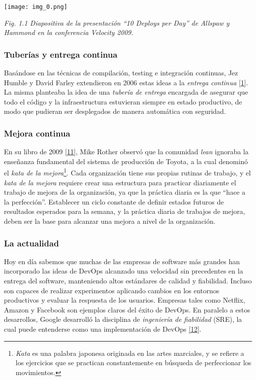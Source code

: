 \texttt{[image: img\_0.png]}


\textit{Fig. 1.1 Diapositiva de la presentación “10 Deploys per Day” de Allspaw y Hammond en la conferencia Velocity 2009.}

\subsubsection{Tuberías y entrega continua}

Basándose en las técnicas de compilación, testing e integración continuas, Jez Humble y David Farley extendieron en 2006 estas ideas a la \textit{entrega continua} \href{https://www.zotero.org/google-docs/?dRCWEw}{[1]}. La misma planteaba la idea de una \textit{tubería de entrega} encargada de asegurar que todo el código y la infraestructura estuvieran siempre en estado productivo, de modo que pudieran ser desplegados de manera automática con seguridad.

\subsubsection{Mejora continua}

En su libro de 2009 \href{https://www.zotero.org/google-docs/?SVvDdD}{[11]}, Mike Rother observó que la comunidad \textit{lean} ignoraba la enseñanza fundamental del sistema de producción de Toyota, a la cual denominó el \textit{kata de la mejora}\footnote{ \textit{Kata} es una palabra japonesa originada en las artes marciales, y se refiere a los ejercicios que se practican constantemente en búsqueda de perfeccionar los movimientos.}. Cada organización tiene sus propias rutinas de trabajo, y el \textit{kata de la mejora} requiere crear una estructura para practicar diariamente el trabajo de mejora de la organización, ya que la práctica diaria es la que “hace a la perfección”. Establecer un ciclo constante de definir estados futuros de resultados esperados para la semana, y la práctica diaria de trabajos de mejora, deben ser la base para alcanzar una mejora a nivel de la organización.

\subsubsection{La actualidad}

Hoy en día sabemos que muchas de las empresas de software más grandes han incorporado las ideas de DevOps alcanzado una velocidad sin precedentes en la entrega del software, manteniendo altos estándares de calidad y fiabilidad. Incluso son capaces de realizar experimentos aplicando cambios en los entornos productivos y evaluar la respuesta de los usuarios. Empresas tales como Netflix, Amazon y Facebook son ejemplos claros del éxito de DevOps. En paralelo a estos desarrollos, Google desarrolló la disciplina de \textit{ingeniería de fiabilidad} (SRE), la cual puede entenderse como una implementación de DevOps \href{https://www.zotero.org/google-docs/?kNZXKw}{[12]}.

